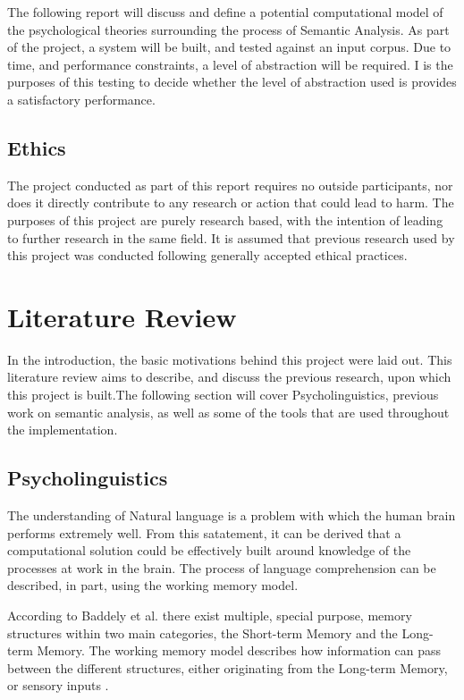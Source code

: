 \documentclass[]{article}
\begin{document}
The following report will discuss and define a potential computational model of the psychological theories surrounding the process of Semantic Analysis. As part of the project, a system will be built, and tested against an input corpus. Due to time, and performance constraints, a level of abstraction will be required. I is the purposes of this testing to decide whether the level of abstraction used is provides a satisfactory performance.

\subsection{Ethics}
\label{sec:IntroEthics}

The project conducted as part of this report requires no outside participants, nor does it directly contribute to any research or action that could lead to harm. The purposes of this project are purely research based, with the intention of leading to further research in the same field. It is assumed that previous research used by this project was conducted following generally accepted ethical practices.

\section{Literature Review}
\label{sec:LitReview}

In the introduction, the basic motivations behind this project were laid out. This literature review aims to describe, and discuss the previous research, upon which this project is built.The following section will cover Psycholinguistics, previous work on semantic analysis, as well as some of the tools that are used throughout the implementation.

\subsection{Psycholinguistics}
\label{sec:Psycholinguistics}
The understanding of Natural language is a problem with which the human brain performs extremely well. From this satatement, it can be derived that a computational solution could be effectively built around knowledge of the processes at work in the brain. The process of language comprehension can be described, in part, using the working memory model\cite{MemoryBaddeleyEysenkAnderson}.

According to Baddely et al. \cite{MemoryBaddeleyEysenkAnderson} there exist multiple, special purpose, memory structures within two main categories, the Short-term Memory and the Long-term Memory. The working memory model describes how information can pass between the different structures, either originating from the Long-term Memory, or sensory inputs \cite{MemoryBaddeleyEysenkAnderson}.
\end{document}
